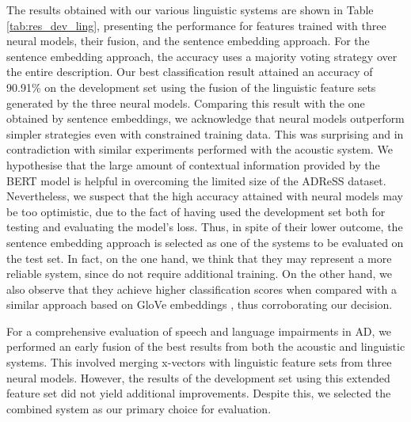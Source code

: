   The results obtained with our various linguistic systems are shown in Table \ref{tab:res_dev_ling}, presenting the performance for features trained with three neural models, their fusion, and the sentence embedding approach. For the sentence embedding approach, the accuracy uses a majority voting strategy over the entire description. Our best classification result attained an accuracy of 90.91\% on the development set using the fusion of the linguistic feature sets generated by the three neural models. Comparing this result with the one obtained by sentence embeddings, we acknowledge that neural models outperform simpler strategies even with constrained training data. This was surprising and in contradiction with similar experiments performed with the acoustic system. We hypothesise that the large amount of contextual information provided by the BERT model is helpful in overcoming the limited size of the ADReSS dataset. Nevertheless, we suspect that the high accuracy attained with neural models may be too optimistic, due to the fact of having used the development set both for testing and evaluating the model’s loss. Thus, in spite of their lower outcome, the sentence embedding approach is selected as one of the systems to be evaluated on the test set. In fact, on the one hand, we think that they may represent a more reliable system, since do not require additional training. On the other hand, we also observe that they achieve higher classification scores when compared with a similar approach based on GloVe embeddings \cite{mirheidari2018detecting}, thus corroborating our decision.

  For a comprehensive evaluation of speech and language impairments in \ac{AD}, we performed an early fusion of the best results from both the acoustic and linguistic systems. This involved merging x-vectors with linguistic feature sets from three neural models. However, the results of the development set using this extended feature set did not yield additional improvements. Despite this, we selected the combined system as our primary choice for evaluation.

